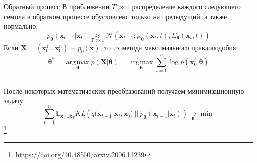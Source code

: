 \documentclass[8pt]{beamer}
\DeclareMathOperator*{\argmax}{\arg\!\max}
\newcommand\blfootnote[1]{%
	\begingroup
	\renewcommand\thefootnote{}\footnote{#1}%
	\addtocounter{footnote}{-1}%
	\endgroup
}
\begin{document}
\begin{frame}
\begin{columns}
		\begin{column}{0.52\textwidth}
			\begin{block}{Обратный процесс}
				В приближении $T\gg 1$ распределение каждого следующего семпла в обратном процессе обусловлено только на предыдущий, а также нормально.
				\begin{equation*}
					p_{\boldsymbol{\theta}}(\textbf{x}_{t-1}|\textbf{x}_t)\!\! \underset{\text{T} \gg 1}{ \approx}\!\!\! \mathcal{N}(\textbf{x}_{t-1};\mu_{\boldsymbol{\theta}}(\textbf{x}_t,t), \Sigma_{\boldsymbol{\theta}}(\textbf{x}_t, t))
				\end{equation*}
			Если $\textbf{X}  = (\textbf{x}_0^1\dots\textbf{x}_0^n)\sim p_0(\textbf{x})$, то из метода максимального правдоподобия:
			\begin{equation*}
				{\boldsymbol{\theta}}^* =\argmax\limits_{{\boldsymbol{\theta}}} p(\textbf{X}|{\boldsymbol{\theta}}) = \argmax\limits_{{\boldsymbol{\theta}}} \sum\limits_{i=1}^n \log{p(\textbf{x}_0^i|{\boldsymbol{\theta}})}
			\end{equation*}			
			\end{block}
		\end{column}
	\end{columns}
\medskip
После некоторых математических преобразований получаем минимизационную задачу:
 \begin{equation*}
	\sum\limits_{t=1}^n \mathbb{E}_{\textbf{x}_1\dots \textbf{x}_T} KL\left(q(\textbf{x}_{t-1}|\textbf{x}_t, \textbf{x}_0)~||~p_{\boldsymbol{\theta}}(\textbf{x}_{t-1}|\textbf{x}_t)  \right) \xrightarrow[{\boldsymbol{\theta}}]{}\min
\end{equation*}
\blfootnote{\url{https://doi.org/10.48550/arxiv.2006.11239}}

\end{frame}
\end{document}
